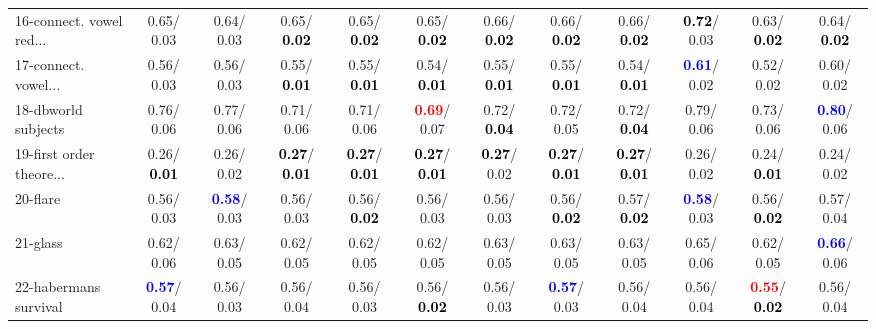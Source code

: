 \begin{table}[h]
\begin{center}
{\begin{tabular}{lc|c|c|c|c|c|c|c|c|c|c}
16-connect. vowel red... &   0.65/  0.03 &   0.64/  0.03 &   0.65/\textcolor{black}{\textbf{  0.02}} &   0.65/\textcolor{black}{\textbf{  0.02}} &   0.65/\textcolor{black}{\textbf{  0.02}} &   0.66/\textcolor{black}{\textbf{  0.02}} &   0.66/\textcolor{black}{\textbf{  0.02}} &   0.66/\textcolor{black}{\textbf{  0.02}} & \textcolor{black}{\textbf{  0.72}}/  0.03 &   0.63/\textcolor{black}{\textbf{  0.02}} &   0.64/\textcolor{black}{\textbf{  0.02}} \\
17-connect. vowel... &   0.56/  0.03 &   0.56/  0.03 &   0.55/\textcolor{black}{\textbf{  0.01}} &   0.55/\textcolor{black}{\textbf{  0.01}} &   0.54/\textcolor{black}{\textbf{  0.01}} &   0.55/\textcolor{black}{\textbf{  0.01}} &   0.55/\textcolor{black}{\textbf{  0.01}} &   0.54/\textcolor{black}{\textbf{  0.01}} & \textcolor{blue}{\textbf{  0.61}}/  0.02 &   0.52/  0.02 &   0.60/  0.02 \\
18-dbworld subjects &   0.76/  0.06 &   0.77/  0.06 &   0.71/  0.06 &   0.71/  0.06 & \textcolor{red}{\textbf{  0.69}}/  0.07 &   0.72/\textcolor{black}{\textbf{  0.04}} &   0.72/  0.05 &   0.72/\textcolor{black}{\textbf{  0.04}} &   0.79/  0.06 &   0.73/  0.06 & \textcolor{blue}{\textbf{  0.80}}/  0.06 \\
19-first order theore... &   0.26/\textcolor{black}{\textbf{  0.01}} &   0.26/  0.02 & \textcolor{black}{\textbf{  0.27}}/\textcolor{black}{\textbf{  0.01}} & \textcolor{black}{\textbf{  0.27}}/\textcolor{black}{\textbf{  0.01}} & \textcolor{black}{\textbf{  0.27}}/\textcolor{black}{\textbf{  0.01}} & \textcolor{black}{\textbf{  0.27}}/  0.02 & \textcolor{black}{\textbf{  0.27}}/\textcolor{black}{\textbf{  0.01}} & \textcolor{black}{\textbf{  0.27}}/\textcolor{black}{\textbf{  0.01}} &   0.26/  0.02 &   0.24/\textcolor{black}{\textbf{  0.01}} &   0.24/  0.02 \\
20-flare &   0.56/  0.03 & \textcolor{blue}{\textbf{  0.58}}/  0.03 &   0.56/  0.03 &   0.56/\textcolor{black}{\textbf{  0.02}} &   0.56/  0.03 &   0.56/  0.03 &   0.56/\textcolor{black}{\textbf{  0.02}} &   0.57/\textcolor{black}{\textbf{  0.02}} & \textcolor{blue}{\textbf{  0.58}}/  0.03 &   0.56/\textcolor{black}{\textbf{  0.02}} &   0.57/  0.04 \\
21-glass &   0.62/  0.06 &   0.63/  0.05 &   0.62/  0.05 &   0.62/  0.05 &   0.62/  0.05 &   0.63/  0.05 &   0.63/  0.05 &   0.63/  0.05 &   0.65/  0.06 &   0.62/  0.05 & \textcolor{blue}{\textbf{  0.66}}/  0.06 \\ \hline
22-habermans survival & \textcolor{blue}{\textbf{  0.57}}/  0.04 &   0.56/  0.03 &   0.56/  0.04 &   0.56/  0.03 &   0.56/\textcolor{black}{\textbf{  0.02}} &   0.56/  0.03 & \textcolor{blue}{\textbf{  0.57}}/  0.03 &   0.56/  0.04 &   0.56/  0.04 & \textcolor{red}{\textbf{  0.55}}/\textcolor{black}{\textbf{  0.02}} &   0.56/  0.04 \\

\end{tabular}}
\end{center}
\end{table}
